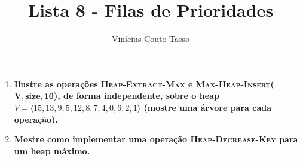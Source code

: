 \documentclass{article}
\title{Lista 8 - Filas de Prioridades}
\author{Vinícius Couto Tasso}
\date{}
\begin{document}
\maketitle
   
         
\begin{enumerate}

\item \textbf{Ilustre as operações \textsc{Heap-Extract-Max} e \textsc{Max-Heap-Insert}($\bm{V,size,10}$), de forma independente, sobre o heap $V = \langle 15, 13, 9, 5, 12, 8, 7, 4, 0, 6, 2, 1 \rangle$ (mostre uma árvore para cada operação).}



\item \textbf{Mostre como implementar uma operação \textsc{Heap-Decrease-Key} para um heap máximo.}




\end{enumerate}
\end{document}
